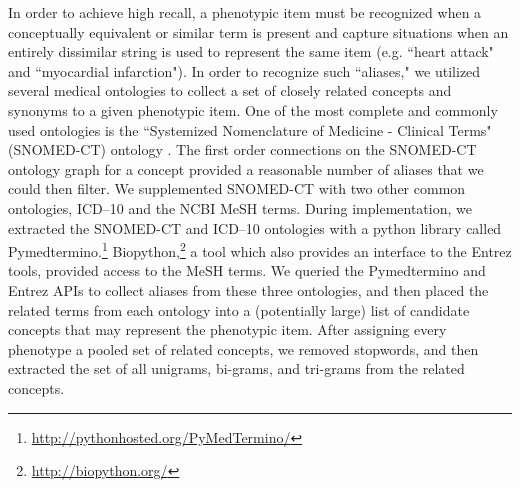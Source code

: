 \documentclass{sig-alternate-05-2015}
\begin{document}

In order to achieve high recall, a phenotypic item must be recognized when a conceptually equivalent or similar term is present and capture situations when an entirely dissimilar string is used to represent the same item  (e.g. ``heart attack" and ``myocardial infarction").
In order to recognize such ``aliases," we utilized several medical ontologies to collect a set of closely related concepts and synonyms to a given phenotypic item.
One of the most complete and commonly used ontologies is the ``Systemized Nomenclature of Medicine - Clinical Terms" (SNOMED-CT) ontology \cite{Wasserman2003}. The first order connections on the SNOMED-CT ontology graph for a concept provided a reasonable number of aliases that we could then filter.
We supplemented SNOMED-CT with two other common ontologies, ICD--10 and the NCBI MeSH terms.
During implementation, we extracted the SNOMED-CT and ICD--10 ontologies with a python library called Pymedtermino.\footnote{\url{http://pythonhosted.org/PyMedTermino/}}
Biopython,\footnote{\url{http://biopython.org/}} a tool which also provides an interface to the Entrez tools, provided access to the MeSH terms.
We queried the Pymedtermino and Entrez APIs to collect aliases from these three ontologies, and then placed the related terms from each ontology into a (potentially large) list of candidate concepts that may represent the phenotypic item.
After assigning every phenotype a pooled set of related concepts, we removed stopwords, and then extracted the set of all unigrams, bi-grams, and tri-grams from the related concepts.
\end{document}
